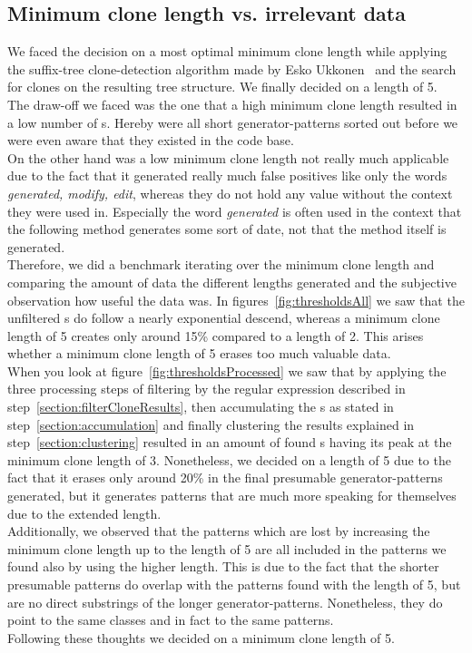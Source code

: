 \subsection{Minimum clone length vs. irrelevant data}
We faced the decision on a most optimal minimum clone length while applying the suffix-tree clone-detection algorithm made by Esko Ukkonen~\cite{Ukkonen1995} and the search for clones on the resulting tree structure. We finally decided on a length of 5. \\
The draw-off we faced was the one that a high minimum clone length resulted in a low number of s. Hereby were all short generator-patterns sorted out before we were even aware that they existed in the code base.\\
On the other hand was a low minimum clone length not really much applicable due to the fact that it generated really much false positives like only the words \textit{generated, modify, edit}, whereas they do not hold any value without the context they were used in. Especially the word \textit{generated} is often used in the context that the following method generates some sort of date, not that the method itself is generated.\\
Therefore, we did a benchmark iterating over the minimum clone length and comparing the amount of data the different lengths generated and the subjective observation how useful the data was. In figures~\ref{fig:thresholdsAll} we saw that the unfiltered s do follow a nearly exponential descend, whereas a minimum clone length of 5 creates only around 15\% compared to a length of 2. This arises whether a minimum clone length of 5 erases too much valuable data.\\
When you look at figure~\ref{fig:thresholdsProcessed} we saw that by applying the three processing steps of filtering by the regular expression described in step~\ref{section:filterCloneResults}, then accumulating the s as stated in step~\ref{section:accumulation} and finally clustering the results explained in step~\ref{section:clustering} resulted in an amount of found s having its peak at the minimum clone length of 3. Nonetheless, we decided on a length of 5 due to the fact that it erases only around 20\% in the final presumable generator-patterns generated, but it generates patterns that are much more speaking for themselves due to the extended length.\\
Additionally, we observed that the patterns which are lost by increasing the minimum clone length up to the length of 5 are all included in the patterns we found also by using the higher length. This is due to the fact that the shorter presumable patterns do overlap with the patterns found with the length of 5, but are no direct substrings of the longer generator-patterns. Nonetheless, they do point to the same classes and in fact to the same patterns.\\
Following these thoughts we decided on a minimum clone length of 5.

